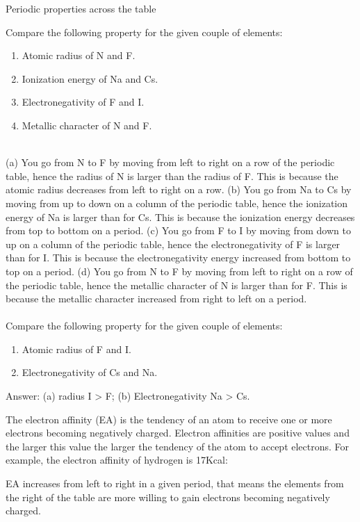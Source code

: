 \documentclass[main.tex]{subfiles}
\begin{document}
\begin{description}
\begin{marginfigure}
\caption{Periodic properties across the table}
\end{marginfigure}%
\begin{example} %
Compare the following property for the given couple of elements:
\begin{enumerate}[label=(\alph*)]
\item Atomic radius of N and F.
\item Ionization energy of Na and Cs.
\item Electronegativity of F and I.
\item Metallic character of N and F. 
\end{enumerate}
\\
(a) You go from N to F by moving from left to right on a row of the periodic table, hence the radius of N is larger than the radius of F. This is because the atomic radius decreases from left to right on a row.
(b) You go from Na to Cs by moving from up to down on a column of the periodic table, hence the ionization energy of Na is larger than for Cs. This is because the ionization energy decreases from top to bottom on a period.
(c) You go from F to I by moving from down to up on a column of the periodic table, hence the electronegativity of F is larger than for I. This is because the electronegativity energy increased from bottom to top on a period.
(d) You go from N to F by moving from left to right on a row of the periodic table, hence the metallic character of N is larger than for F. This is because the metallic character increased from right to left on a period.
\\
\faDiamond\ \\
Compare the following property for the given couple of elements:
\begin{enumerate}[label=(\alph*)]
\item Atomic radius of F and I.
\item Electronegativity of Cs and Na.
\end{enumerate}
\flushright Answer: (a) radius I > F; (b) Electronegativity Na > Cs.
\end{example}%

\item[\docfilehook{Electron affinity}{}] 
The electron affinity (EA) is the tendency of an atom to receive one or more electrons becoming negatively charged.  Electron affinities are positive values and the larger this value the larger the tendency of the atom to accept electrons. For example, the electron affinity of hydrogen is 17Kcal:
\begin{center} \end{center}
EA increases from left to right in a given period, that means the elements from the right of the table are more willing to gain electrons becoming negatively charged.

\end{description}
\end{document}
